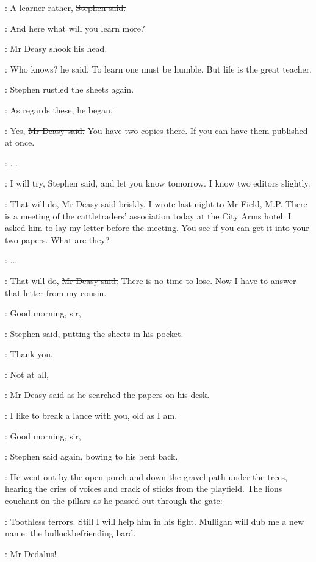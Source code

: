 \Stephen:
A learner rather, \sout{Stephen said.}

\StephenInt:
And here what will you learn more?

:
Mr Deasy shook his head.

\deasy:
Who knows? \sout{he said.}
To learn one must be humble.
But life is the great teacher.

:
Stephen rustled the sheets again.

\Stephen:
As regards these, \sout{he began.}

\deasy:
Yes, \sout{Mr Deasy said.}
You have two copies there.
If you can have them published at once.

\StephenInt:
.
.

\Stephen:
I will try, \sout{Stephen said,}
and let you know tomorrow.
I know two editors slightly.

\deasy:
That will do, \sout{Mr Deasy said briskly.}
I wrote last night to Mr Field, M.P.
There is a meeting of the cattletraders' association today
at the City Arms hotel.
I asked him to lay my letter before the meeting.
You see if you can get it into your two papers.
What are they?

\Stephen:
 ...

\deasy:
That will do, \sout{Mr Deasy said.}
There is no time to lose.
Now I have to answer that letter from my cousin.

\Stephen:
Good morning, sir,

:
Stephen said, putting the sheets in his pocket.

\Stephen:
Thank you.

\deasy:
Not at all,

:
Mr Deasy said as he searched the papers on his desk.

\deasy:
I like to break a lance with you, old as I am.

\Stephen:
Good morning, sir,

:
Stephen said again, bowing to his bent back.

:
He went out by the open porch and down the gravel path under the trees,
hearing the cries of voices and crack of sticks from the playfield.
The lions couchant on the pillars as he passed out through the gate:

\StephenInt:
Toothless terrors.
Still I will help him in his fight.
Mulligan will dub me a new name: the bullockbefriending bard.

\deasy:
Mr Dedalus!

